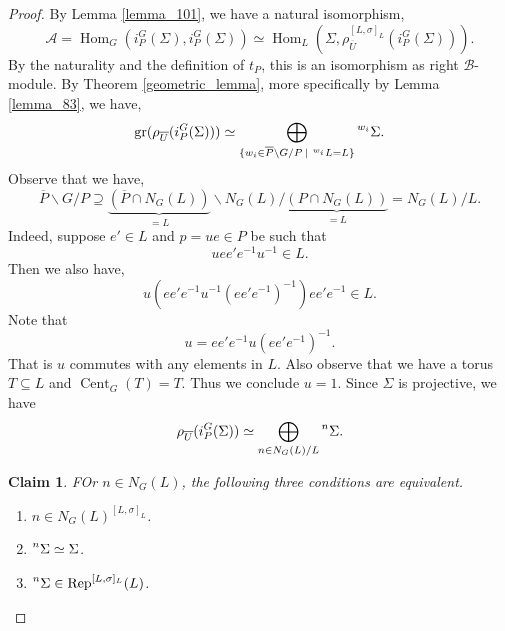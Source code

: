 \documentclass[8pt]{article}
\newtheorem{claim}{Claim}
\DeclareMathOperator{\Rep}{Rep}
\DeclareMathOperator{\Hom}{Hom}
\DeclareMathOperator{\gr}{gr}
\DeclareMathOperator{\Cent}{Cent}
\newcommand{\sep}[0]{\:|\:}
\newcommand{\cA}{\mathcal{A}}
\newcommand{\cB}{\mathcal{B}}
\begin{document}
  \begin{proof}
    By Lemma \ref{lemma_101}, we have a natural isomorphism, 
    \begin{equation*}
      \cA = \Hom_G(i_P^G(\Sigma),i_P^G(\Sigma))\simeq\Hom_L(\Sigma,\rho_{\overline{U}}^{[L,\sigma]_L}(i_P^G(\Sigma))).
    \end{equation*}
    By the naturality and the definition of $t_P$, this is an isomorphism as right $\cB$-module. By Theorem \ref{geometric_lemma}, more specifically by Lemma \ref{lemma_83}, we have,
    \begin{equation*}
      \gr(\rho_{\overline{U}}(i_P^G(\Sigma)))\simeq\bigoplus_{\{w_i\in \overline{P}\backslash G/P\sep\prescript{w_i}{}{L}=L\}}\prescript{w_i}{}{\Sigma}.
    \end{equation*}
    Observe that we have,
    \begin{equation*}
      \overline{P}\backslash G/P\supseteq \underbrace{(\overline{P}\cap N_G(L))}_{=L}\backslash N_G(L)/\underbrace{(P\cap N_G(L))}_{=L}=N_G(L)/L.
    \end{equation*}
    Indeed, suppose $e'\in L$ and $p = ue\in P$ be such that 
    \begin{equation*}
      uee'e^{-1}u^{-1}\in L.
    \end{equation*}
    Then we also have,
    \begin{equation*}
      u(ee'e^{-1}u^{-1}(ee'e^{-1})^{-1})ee'e^{-1}\in L. 
    \end{equation*}
    Note that 
    \begin{equation*}
      u = ee'e^{-1}u(ee'e^{-1})^{-1}.
    \end{equation*}
    That is $u$ commutes with any elements in $L$. Also observe that we have a torus $T\subseteq L$ and $\Cent_G(T)=T$. Thus we conclude $u=1$.
    Since $\Sigma$ is projective, we have 
    \begin{equation*}
      \rho_{\overline{U}}(i_P^G(\Sigma)) \simeq \bigoplus_{n\in N_G(L)/L}\prescript{n}{}{\Sigma}.
    \end{equation*}
    \begin{claim}
      FOr $n\in N_G(L)$, the following three conditions are equivalent.
      \begin{enumerate}
        \item $n\in N_G(L)^{[L,\sigma]_L}$.
        \item $\prescript{n}{}{\Sigma}\simeq\Sigma$.
        \item $\prescript{n}{}{\Sigma}\in\Rep^{[L,\sigma]_L}(L)$.
      \end{enumerate}

\end{claim}
\end{proof}
\end{document}
